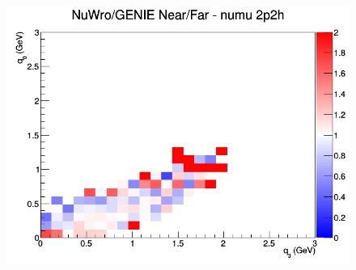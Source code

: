 \begin{figure}[h]
\endminipage
{}
\includegraphics[width=\linewidth]{eff_q0_q3/GAr/ratios/2p2h_NuWro_GENIE_numu_NF_q3_q0.png}
\endminipage
\newline
\end{figure}
\clearpage
